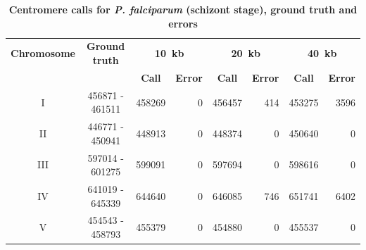 \begin{table}[ht!]
\caption{\textbf{Centromere calls for \textit{P. falciparum} (schizont stage),
ground truth and errors}}
\vspace{10pt}
\small
\begin{center}
\begin{tabular}{c | c  r  r  r  r r r}
\textbf{Chromosome}  & \textbf{Ground truth} & \multicolumn{2}{c}{\textbf{10~kb}} & \multicolumn{2}{c}{\textbf{20~kb}} & \multicolumn{2}{c}{\textbf{40~kb}} \\
  &   &  \multicolumn{1}{c}{\textbf{Call}} &  \multicolumn{1}{c}{\textbf{Error}} &  \multicolumn{1}{c}{\textbf{Call}} &  \multicolumn{1}{c}{\textbf{Error}} &  \multicolumn{1}{c}{\textbf{Call}} &  \multicolumn{1}{c}{\textbf{Error}} \\
\hline
I & \num[group-separator={\,}]{456871} - \num[group-separator={\,}]{461511} & \num[group-separator={\,}]{458269} & \small{\num[group-separator={\,}]{0}}  & \num[group-separator={\,}]{456457} & \small{\num[group-separator={\,}]{414}}  & \num[group-separator={\,}]{453275} & \small{\num[group-separator={\,}]{3596}}  \\
II & \num[group-separator={\,}]{446771} - \num[group-separator={\,}]{450941} & \num[group-separator={\,}]{448913} & \small{\num[group-separator={\,}]{0}}  & \num[group-separator={\,}]{448374} & \small{\num[group-separator={\,}]{0}}  & \num[group-separator={\,}]{450640} & \small{\num[group-separator={\,}]{0}}  \\
III & \num[group-separator={\,}]{597014} - \num[group-separator={\,}]{601275} & \num[group-separator={\,}]{599091} & \small{\num[group-separator={\,}]{0}}  & \num[group-separator={\,}]{597694} & \small{\num[group-separator={\,}]{0}}  & \num[group-separator={\,}]{598616} & \small{\num[group-separator={\,}]{0}}  \\
IV & \num[group-separator={\,}]{641019} - \num[group-separator={\,}]{645339} & \num[group-separator={\,}]{644640} & \small{\num[group-separator={\,}]{0}}  & \num[group-separator={\,}]{646085} & \small{\num[group-separator={\,}]{746}}  & \num[group-separator={\,}]{651741} & \small{\num[group-separator={\,}]{6402}}  \\
V & \num[group-separator={\,}]{454543} - \num[group-separator={\,}]{458793} & \num[group-separator={\,}]{455379} & \small{\num[group-separator={\,}]{0}}  & \num[group-separator={\,}]{454880} & \small{\num[group-separator={\,}]{0}}  & \num[group-separator={\,}]{455537} & \small{\num[group-separator={\,}]{0}}  \\

\end{tabular}
\end{center}
\end{table}
